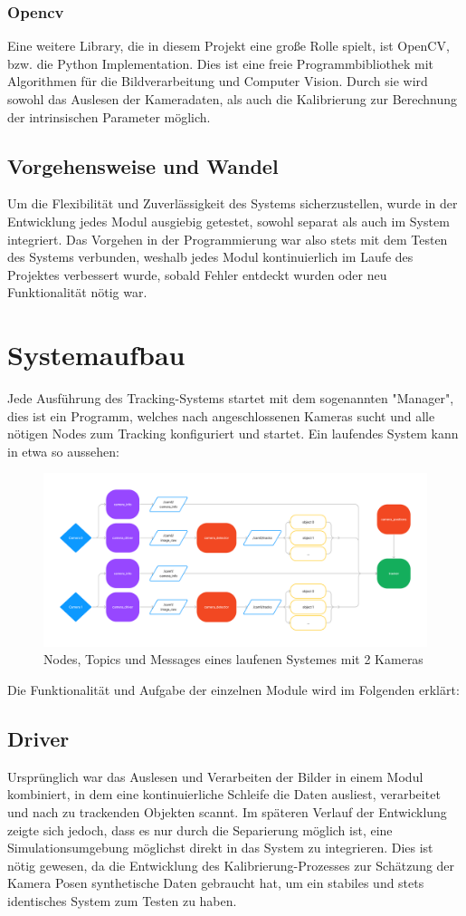 \documentclass[12pt, ngerman]{article}
\begin{document}
\subsubsection{Opencv}
Eine weitere Library, die in diesem Projekt eine große Rolle spielt, ist OpenCV, bzw. die Python Implementation. Dies ist eine freie Programmbibliothek mit Algorithmen für die Bildverarbeitung und Computer Vision. Durch sie wird sowohl das Auslesen der Kameradaten, als auch die Kalibrierung zur Berechnung der intrinsischen Parameter möglich.
\subsection{Vorgehensweise und Wandel}
Um die Flexibilität und Zuverlässigkeit des Systems sicherzustellen, wurde in der Entwicklung jedes Modul ausgiebig getestet, sowohl separat als auch im System integriert. Das Vorgehen in der Programmierung war also stets mit dem Testen des Systems verbunden, weshalb jedes Modul kontinuierlich im Laufe des Projektes verbessert wurde, sobald Fehler entdeckt wurden oder neu Funktionalität nötig war. 

\section{Systemaufbau}
Jede Ausführung des Tracking-Systems startet mit dem sogenannten "Manager", dies ist ein Programm, welches nach angeschlossenen Kameras sucht und alle nötigen Nodes zum Tracking konfiguriert und startet. Ein laufendes System kann in etwa so aussehen:
\begin{figure}[h]
  \centering
  \includegraphics[angle=0,width=\linewidth]{anytrack-basic-tracking.png}
  \caption{Nodes, Topics und Messages eines laufenen Systemes mit 2 Kameras}
\end{figure}

Die Funktionalität und Aufgabe der einzelnen Module  wird im Folgenden erklärt:
\subsection{Driver}
Ursprünglich war das Auslesen und Verarbeiten der Bilder in einem Modul kombiniert, in dem eine kontinuierliche Schleife die Daten ausliest, verarbeitet und nach zu trackenden Objekten scannt. Im späteren Verlauf der Entwicklung zeigte sich jedoch, dass es nur durch die Separierung möglich ist, eine Simulationsumgebung möglichst direkt in das System zu integrieren. Dies ist nötig gewesen, da die Entwicklung des Kalibrierung-Prozesses zur Schätzung der Kamera Posen synthetische Daten gebraucht hat, um ein stabiles und stets identisches System zum Testen zu haben. 
\end{document}
